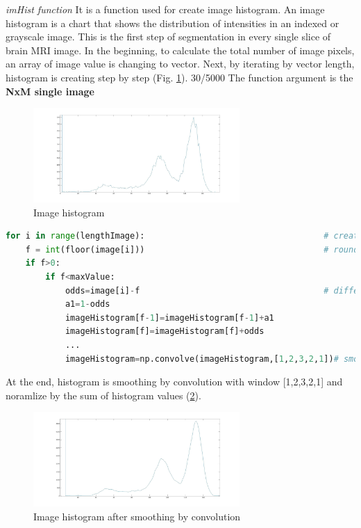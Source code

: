 \textit{imHist function}
It is a function used for create image histogram. An image histogram is a chart that shows the distribution of intensities in an indexed or grayscale image. This is the first step of segmentation in every single slice of brain MRI image. In the beginning, to calculate the total number of image pixels, an array of image value is changing to vector. Next, by iterating by vector length, histogram is creating step by step (Fig. \ref{fig:figures/m09_11}). 
30/5000
The function argument is the \textbf{NxM single image}

\begin{figure}[H]
	\centering{}\includegraphics[width=0.7\textwidth]{figures/Module_09/m09_11}
	\caption{Image histogram  
	\label{fig:figures/m09_11}}
\end{figure} 

\begin{lstlisting}[language=Python, caption = Create image histogram]
for i in range(lengthImage):									# create histogram of non-zero image values
    f = int(floor(image[i]))									# round floor
    if f>0:
        if f<maxValue:
            odds=image[i]-f             						# difference between image and round floor image value
            a1=1-odds
            imageHistogram[f-1]=imageHistogram[f-1]+a1
            imageHistogram[f]=imageHistogram[f]+odds
            ...
            imageHistogram=np.convolve(imageHistogram,[1,2,3,2,1])# smoothing the histogram
\end{lstlisting}

At the end, histogram is smoothing by convolution with window [1,2,3,2,1] and noramlize by the sum of histogram values (\ref{fig:figures/m09_12}).

\begin{figure}[H]
	\centering{}\includegraphics[width=0.7\textwidth]{figures/Module_09/m09_12}
	\caption{Image histogram  after smoothing by convolution
	\label{fig:figures/m09_12}}
\end{figure} 

